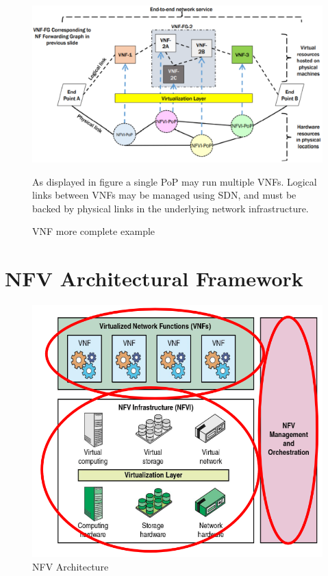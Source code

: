 \begin{figure}[htbp]
   \centering
   \includegraphics{images/vnf_fullarch.png}
   \caption{VNF more complete example}
   As displayed in figure a single PoP may run multiple VNFs.
   Logical links between VNFs may be managed using SDN, and must be backed by physical links in the underlying network infrastructure.
   \label{fig:vnf_fullarch}
\end{figure}

\section{NFV Architectural Framework}
\begin{figure}[htbp]
   \centering
   \includegraphics{images/NFV_architecture.png}
   \caption{NFV Architecture}
   \label{fig:NFV_architecture}
\end{figure}

